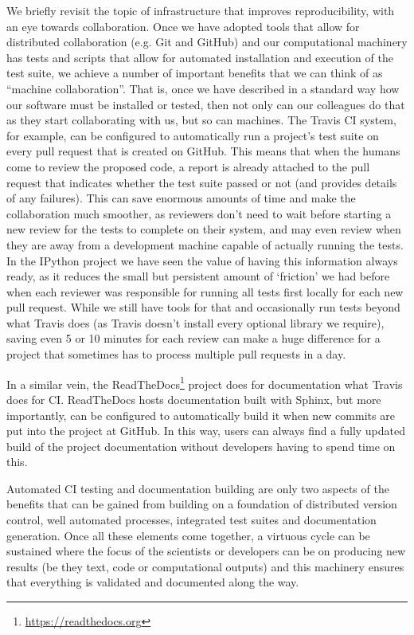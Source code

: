 \documentclass[ChapterTOCs,krantz2]{krantz} %
\begin{document}
We briefly revisit the topic of infrastructure that improves reproducibility,
with an eye towards collaboration.  Once we have adopted tools that allow for
distributed collaboration (e.g. Git and GitHub) and our computational machinery
has tests and scripts that allow for automated installation and execution of
the test suite, we achieve a number of important benefits that we can think of
as ``machine collaboration''.  That is, once we have described in a standard
way how our software must be installed or tested, then not only can our
colleagues do that as they start collaborating with us, but so can machines.
The Travis CI system, for example, can be configured to automatically run a
project's test suite on every pull request that is created on GitHub.  This
means that when the humans come to review the proposed code, a report is
already attached to the pull request that indicates whether the test suite
passed or not (and provides details of any failures).  This can save enormous
amounts of time and make the collaboration much smoother, as reviewers don't
need to wait before starting a new review for the tests to complete on their
system, and may even review when they are away from a development machine
capable of actually running the tests.  In the IPython project we have seen the
value of having this information always ready, as it reduces the small but
persistent amount of `friction' we had before when each reviewer was
responsible for running all tests first locally for each new pull request.
While we still have tools for that and occasionally run tests beyond what
Travis does (as Travis doesn't install every optional library we require),
saving even 5 or 10 minutes for each review can make a huge difference for a
project that sometimes has to process multiple pull requests in a day.

In a similar vein, the ReadTheDocs\footnote{\url{https://readthedocs.org}}
project does for documentation what Travis does for CI.  ReadTheDocs hosts
documentation built with Sphinx, but more importantly, can be configured to
automatically build it when new commits are put into the project at GitHub.  In
this way, users can always find a fully updated build of the project
documentation without developers having to spend time on this.

Automated CI testing and documentation building are only two aspects of the
benefits that can be gained from building on a foundation of distributed
version control, well automated processes, integrated test suites and
documentation generation.  Once all these elements come together, a virtuous
cycle can be sustained where the focus of the scientists or developers can be
on producing new results (be they text, code or computational outputs) and this
machinery ensures that everything is validated and documented along the way.
\end{document}
